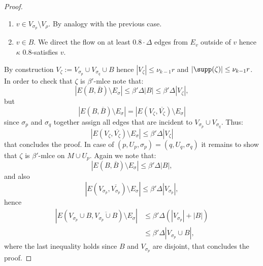 \begin{proof}
\begin{enumerate}
Note that if $\sigma_p=\sigma_q$, then we $0.8$-satisfy $v$.
\item $v\in V_{\sigma_p}\setminus V_\rho$. By analogy with the previous case.
\item $v\in B$. We direct the flow on at least $0.8\cdot\Delta$ edges from $E_v$ outside of $v$ hence $\kappa$ $0.8$-satisfies $v$.
\end{enumerate}
By construction $V_\zeta:=V_{\sigma_p}\cup V_{\sigma_q}\cup B$ hence $|V_\zeta|\le\nu_{k-1}r$ and $|\supp(\zeta)|\le\nu_{k-1}r$. In order to check that $\zeta$ is $\beta'$-mlce note that:
\[|E(B,\overline B)\setminus E_\sigma|\le\beta'\Delta|B|\le\beta'\Delta|V_\zeta|,\]
but
\[|E(B,\overline B)\setminus E_\sigma|=|E(V_\zeta,\overline{V_\zeta})\setminus E_\sigma|\]
since $\sigma_p$ and $\sigma_q$ together assign all edges that are incident to $V_{\sigma_p}\cup V_{\sigma_q}$. Thus:
\[|E(V_\zeta,\overline{V_\zeta})\setminus E_\sigma|\le\beta'\Delta|V_\zeta|\]
that concludes the proof.
In case of $(p,U_p,\sigma_p)=(q,U_q,\sigma_q)$ it remains to show that $\zeta$ is $\beta'$-mlce on $M\cup U_p$. Again we note that:
\[|E(B,\overline B)\setminus E_\sigma|\le\beta'\Delta|B|,\]
and also
\[|E(V_{\sigma_p},\overline{V_{\sigma_p}})\setminus E_\sigma|\le\beta'\Delta|V_{\sigma_p}|,\]
hence
\begin{align*}
|E(V_{\sigma_p}\cup B,\overline{V_{\sigma_p}\cup B})\setminus E_\sigma|
&\le\beta'\Delta(|V_{\sigma_p}|+|B|)\\
&\le\beta'\Delta|V_{\sigma_p}\cup B|,
\end{align*}
where the last inequality holds since $B$ and $V_{\sigma_p}$ are disjoint, that concludes the proof.
\end{proof}
